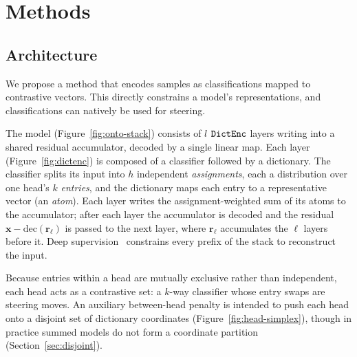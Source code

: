 \section{Methods}

\subsection{Architecture}
\label{sec:arch}
We propose a method that encodes samples as classifications mapped to
contrastive vectors. This directly constrains a model's representations,
and classifications can natively be used for steering.

The model (Figure~\ref{fig:onto-stack}) consists of $l$ $\mathop{\mathtt{DictEnc}}\limits$
layers writing into a shared residual accumulator, decoded by a single
linear map. Each layer (Figure~\ref{fig:dictenc}) is composed of a
classifier followed by a dictionary. The classifier splits its input
into $h$ independent \emph{assignments}, each a distribution over one
head's $k$ \emph{entries}, and the dictionary maps each entry to a
representative vector (an \emph{atom}). Each layer writes the
assignment-weighted sum of its atoms to the accumulator; after each
layer the accumulator is decoded and the residual
$\mathbf{x} - \mathrm{dec}(\mathbf{r}_\ell)$ is passed to the next
layer, where $\mathbf{r}_\ell$ accumulates the $\ell$ layers before it.
Deep supervision~\cite{lee2015deeply} constrains every prefix of the
stack to reconstruct the input.

Because entries within a head are mutually exclusive rather than
independent, each head acts as a contrastive set: a $k$-way classifier
whose entry swaps are steering moves. An auxiliary between-head penalty
is intended to push each head onto a disjoint set of dictionary
coordinates (Figure~\ref{fig:head-simplex}), though in practice summed
models do not form a coordinate partition (Section~\ref{sec:disjoint}).

